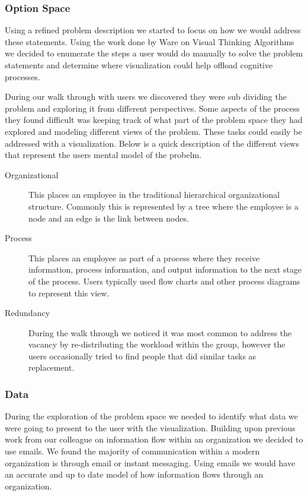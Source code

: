 \documentclass[journal]{vgtc}                %
\begin{document}
\subsubsection{Option Space}
Using a refined problem description we started to focus on how we would address these statements.  Using the work done by Ware on Visual Thinking Algorithms\cite[Chapter 11]{ware2012information} we decided to enumerate the steps a user would do manually to solve the problem statements and determine where visualization could help offload cognitive processes.

During our walk through with users we discovered they were sub dividing the problem and exploring it from different perspectives.  Some aspects of the process they found difficult was keeping track of what part of the problem space they had explored and modeling different views of the problem.  These tasks could easily be addressed with a visualization.  Below is a quick description of the different views that represent the users mental model of the probelm.
\begin{description}
\item [Organizational] This places an employee in the traditional hierarchical organizational structure.  Commonly this is represented by a tree where the employee is a node and an edge is the link between nodes.
\item [Process] This places an employee as part of a process where they receive information, process information, and output information to the next stage of the process.  Users typically used flow charts and other process diagrams to represent this view.
\item [Redundancy] During the walk through we noticed it was most common to address the vacancy by re-distributing the workload within the group, however the users occasionally tried to find people that did similar tasks as replacement.
\end{description}

\subsubsection{Data}
During the exploration of the problem space we needed to identify what data we were going to present to the user with the visualization.  Building upon previous work from our colleague on information flow within an organization we decided to use emails.  We found the majority of communication within a modern organization is through email or instant messaging.  Using emails we would have an accurate and up to date model of how information flows through an organization.  
\end{document}
